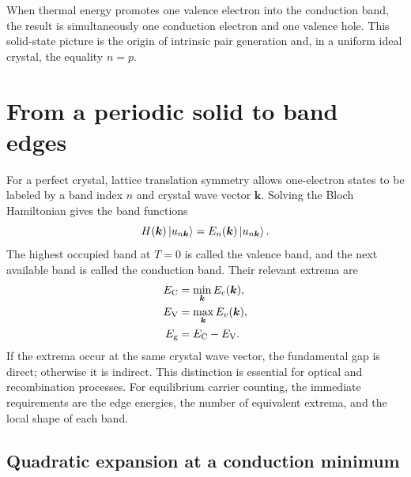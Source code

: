 When thermal energy promotes one valence electron into the conduction band, the
result is simultaneously one conduction electron and one valence hole.  This
solid-state picture is the origin of intrinsic pair generation and, in a
uniform ideal crystal, the equality $n=p$.

\section{From a periodic solid to band edges}

For a perfect crystal, lattice translation symmetry allows one-electron states
to be labeled by a band index $n$ and crystal wave vector $\bm k$.  Solving the
Bloch Hamiltonian gives the band functions
\begin{equation}
  H(\bm k)\ket{u_{n\bm k}}
  =E_n(\bm k)\ket{u_{n\bm k}}.
  \label{eq:bloch-band-eigenproblem}
\end{equation}
The highest occupied band at $T=0$ is called the valence band, and the next
available band is called the conduction band.  Their relevant extrema are
\begin{align}
  E_{\mathrm C}&=\min_{\bm k}E_c(\bm k),
  \label{eq:conduction-band-minimum}\\
  E_{\mathrm V}&=\max_{\bm k}E_v(\bm k),
  \label{eq:valence-band-maximum}\\
  E_{\mathrm g}&=E_{\mathrm C}-E_{\mathrm V}.
  \label{eq:intrinsic-band-gap}
\end{align}
If the extrema occur at the same crystal wave vector, the fundamental gap is
direct; otherwise it is indirect.  This distinction is essential for optical
and recombination processes.  For equilibrium carrier counting, the immediate
requirements are the edge energies, the number of equivalent extrema, and the
local shape of each band.

\subsection{Quadratic expansion at a conduction minimum}

